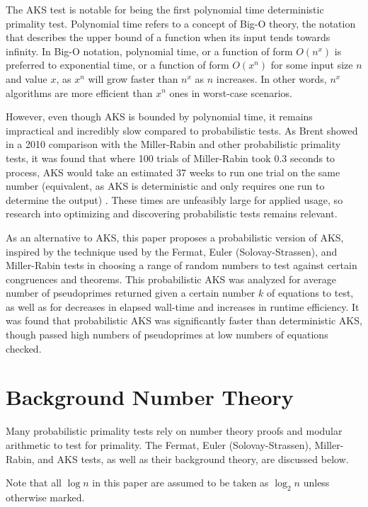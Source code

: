 \documentclass{article}
\begin{document}
The AKS test is notable for being the first polynomial time deterministic primality test. Polynomial time refers to a concept of Big-O theory, the notation that describes the upper bound of a function when its input tends towards infinity. In Big-O notation, polynomial time, or a function of form $O(n^x)$ is preferred to exponential time, or a function of form $O(x^n)$ for some input size $n$ and value $x$, as $x^n$ will grow faster than $n^x$ as $n$ increases. In other words, $n^x$ algorithms are more efficient than $x^n$ ones in worst-case scenarios. 

However, even though AKS is bounded by polynomial time, it remains impractical and incredibly slow compared to probabilistic tests. As Brent showed in a 2010 comparison with the Miller-Rabin and other probabilistic primality tests, it was found that where 100 trials of Miller-Rabin took 0.3 seconds to process, AKS would take an estimated 37 weeks to run one trial on the same number (equivalent, as AKS is deterministic and only requires one run to determine the output) \cite{brent_primality_2010}. These times are unfeasibly large for applied usage, so research into optimizing and discovering probabilistic tests remains relevant.

As an alternative to AKS, this paper proposes a probabilistic version of AKS, inspired by the technique used by the Fermat, Euler (Solovay-Strassen), and Miller-Rabin tests in choosing a range of random numbers to test against certain congruences and theorems. This probabilistic AKS was analyzed for average number of pseudoprimes returned given a certain number $k$ of equations to test, as well as for decreases in elapsed wall-time and increases in runtime efficiency. It was found that probabilistic AKS was significantly faster than deterministic AKS, though passed high numbers of pseudoprimes at low numbers of equations checked.

\section{Background Number Theory}

Many probabilistic primality tests rely on number theory proofs and modular arithmetic to test for primality. The Fermat, Euler (Solovay-Strassen), Miller-Rabin, and AKS tests, as well as their background theory, are discussed below.

Note that all $\log{n}$ in this paper are assumed to be taken as $\log_{2}{n}$ unless otherwise marked.
\end{document}
